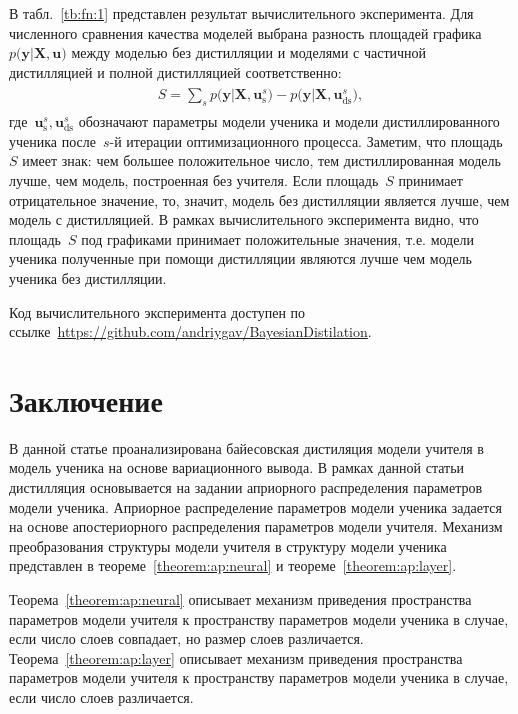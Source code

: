 \documentclass[12pt]{a&t}
\begin{document}
В табл.~\ref{tb:fn:1} представлен результат вычислительного эксперимента. Для численного сравнения качества моделей выбрана разность площадей графика $p\bigr(\mathbf{y}|\mathbf{X}, \mathbf{u}\bigr)$ между моделью без дистилляции и моделями с частичной дистилляцией и полной дистилляцией соответственно:
\begin{gather}
\label{eq:ex:8}
\begin{aligned}
S = \sum_{s} p\bigr(\mathbf{y}|\mathbf{X}, \mathbf{u}^s_{\text{s}}\bigr) - p\bigr(\mathbf{y}|\mathbf{X}, \mathbf{u}^s_{\text{ds}}\bigr),
\end{aligned}
\end{gather}
где~$\mathbf{u}^s_{\text{s}}, \mathbf{u}^s_{\text{ds}}$ обозначают параметры модели ученика и модели дистиллированного ученика после~$s$-й итерации оптимизационного процесса. Заметим, что площадь~$S$ имеет знак: чем большее положительное число, тем дистиллированная модель лучше, чем модель, построенная без учителя. Если площадь~$S$ принимает отрицательное значение, то, значит, модель без дистилляции является лучше, чем модель с дистилляцией. В рамках вычислительного эксперимента видно, что площадь~$S$ под графиками принимает положительные значения, т.е. модели ученика полученные при помощи дистилляции являются лучше чем модель ученика без дистилляции.

Код вычислительного эксперимента доступен по ссылке~\url{https://github.com/andriygav/BayesianDistilation}.

\section{Заключение}

В данной статье проанализирована байесовская дистиляция модели учителя в модель ученика на основе вариационного вывода.
В рамках данной статьи дистилляция основывается на задании априорного распределения параметров модели ученика.
Априорное распределение параметров модели ученика задается на основе апостериорного распределения параметров модели учителя.
Механизм преобразования структуры модели учителя в структуру модели ученика представлен в теореме~\ref{theorem:ap:neural} и теореме~\ref{theorem:ap:layer}.

Теорема~\ref{theorem:ap:neural} описывает механизм приведения пространства параметров модели учителя к пространству параметров модели ученика в случае, если число слоев совпадает, но размер слоев различается. Теорема~\ref{theorem:ap:layer} описывает механизм приведения пространства параметров модели учителя к пространству параметров модели ученика в случае, если число слоев различается.
\end{document}
